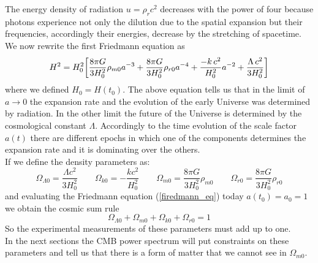 \documentclass{article}
\newcommand{\beq}{\begin{equation}}
\newcommand{\eeq}{\end{equation}}
\begin{document}
The energy density of radiation $u = \rho_r c^2 $ decreases with the power of four because photons experience not only the dilution due to the spatial expansion but their frequencies, accordingly their energies, decrease by the stretching of spacetime.\\
We now rewrite the first Friedmann equation as
\begin{equation}
H ^2 = H_0 ^2 \qty[
\dfrac{8 \pi G}{3 H_0 ^2} \rho_{m 0} a^{-3}+
\dfrac{8 \pi G}{3 H_0 ^2} \rho_{r 0} a^{-4}+ 
\dfrac{-k \, c^2}{H_0 ^2} a^{-2} + \dfrac{\Lambda \, c^2}{3 H_0 ^2}
] \notag
\end{equation}
where we defined $H_0 = H(t_0)$.
The above equation tells us that in the limit of $a \rightarrow 0$ the expansion rate and the evolution of the early Universe was determined by radiation.
In the other limit the future of the Universe is determined by the cosmological constant $\Lambda$.
Accordingly to the time evolution of the scale factor $a(t)$ there are different epochs in which one of the components determines the expansion rate and it is dominating over the others.
\\
If we define the density parameters as:
\beq
\Omega_{\Lambda 0} = \dfrac{\Lambda c^2}{3 H_0 ^2} \qquad \Omega_{k0} = -  \dfrac{k c^2}{H_0 ^2} \qquad
\Omega_{m0} = \dfrac{8 \pi G}{3 H_0 ^2} \rho_{m 0} \qquad \Omega_{r0} =\dfrac{8 \pi G}{3 H_0 ^2} \rho_{r 0}
\eeq
 and evaluating the Friedmann equation (\ref{firedmann_eq}) today $a(t_0) =a_0 =1$ we obtain the cosmic sum rule
\begin{equation}
\label{cosmic_rule}
\Omega_{\Lambda 0} + \Omega_{m 0} + \Omega_{k 0} + \Omega_{r 0} = 1
\end{equation}
So the experimental measurements of these parameters must add up to one.\\
In the next sections the CMB power spectrum will put constraints on these parameters and tell us that there is a form of matter that we cannot see in $\Omega_{m0}$.
\end{document}
